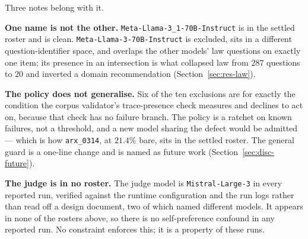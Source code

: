 Three notes belong with it.

\textbf{One name is not the other.} \texttt{Meta-Llama-3\_1-70B-Instruct} is in
the settled roster and is clean. \texttt{Meta-Llama-3-70B-Instruct} is excluded,
sits in a different question-identifier space, and overlaps the other models'
law questions on exactly one item; its presence in an intersection is what
collapsed law from $287$ questions to $20$ and inverted a domain recommendation
(Section~\ref{sec:res-law}).

\textbf{The policy does not generalise.} Six of the ten exclusions are for
exactly the condition the corpus validator's trace-presence check measures and
declines to act on, because that check has no failure branch. The policy is a
ratchet on known failures, not a threshold, and a new model sharing the defect
would be admitted --- which is how \texttt{arx\_0314}, at $21.4\%$ bare, sits in
the settled roster. The general guard is a one-line change and is named as
future work (Section~\ref{sec:disc-future}).

\textbf{The judge is in no roster.} The judge model is
\texttt{Mistral-Large-3} in every reported run, verified against the runtime
configuration and the run logs rather than read off a design document, two of
which named different models. It appears in none of the rosters above, so there
is no self-preference confound in any reported run. No constraint enforces
this; it is a property of these runs.
